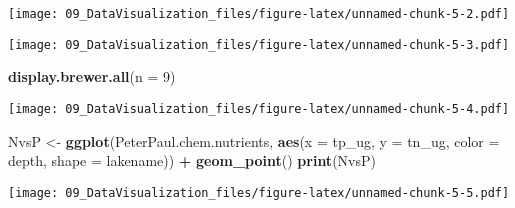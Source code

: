 \documentclass[]{article}
\newenvironment{Shaded}{\begin{snugshade}}{\end{snugshade}}
\newcommand{\KeywordTok}[1]{\textcolor[rgb]{0.13,0.29,0.53}{\textbf{#1}}}
\newcommand{\DataTypeTok}[1]{\textcolor[rgb]{0.13,0.29,0.53}{#1}}
\newcommand{\DecValTok}[1]{\textcolor[rgb]{0.00,0.00,0.81}{#1}}
\newcommand{\StringTok}[1]{\textcolor[rgb]{0.31,0.60,0.02}{#1}}
\newcommand{\OperatorTok}[1]{\textcolor[rgb]{0.81,0.36,0.00}{\textbf{#1}}}
\newcommand{\NormalTok}[1]{#1}
\begin{document}
\texttt{[image: 09\_DataVisualization\_files/figure-latex/unnamed-chunk-5-2.pdf]}

\begin{Shaded}
\end{Shaded}

\texttt{[image: 09\_DataVisualization\_files/figure-latex/unnamed-chunk-5-3.pdf]}

\begin{Shaded}
\begin{Highlighting}[]
\KeywordTok{display.brewer.all}\NormalTok{(}\DataTypeTok{n =} \DecValTok{9}\NormalTok{)}
\end{Highlighting}
\end{Shaded}

\texttt{[image: 09\_DataVisualization\_files/figure-latex/unnamed-chunk-5-4.pdf]}

\begin{Shaded}
\begin{Highlighting}[]
\NormalTok{NvsP <-}
\StringTok{  }\KeywordTok{ggplot}\NormalTok{(PeterPaul.chem.nutrients, }\KeywordTok{aes}\NormalTok{(}\DataTypeTok{x =}\NormalTok{ tp_ug, }\DataTypeTok{y =}\NormalTok{ tn_ug, }\DataTypeTok{color =}\NormalTok{ depth, }\DataTypeTok{shape =}\NormalTok{ lakename)) }\OperatorTok{+}
\StringTok{  }\KeywordTok{geom_point}\NormalTok{() }
\KeywordTok{print}\NormalTok{(NvsP)}
\end{Highlighting}
\end{Shaded}

\texttt{[image: 09\_DataVisualization\_files/figure-latex/unnamed-chunk-5-5.pdf]}
\end{document}
